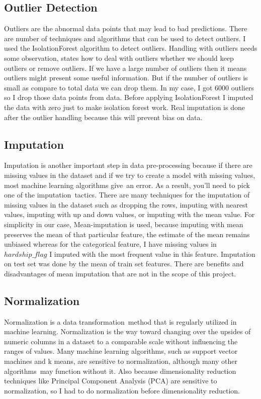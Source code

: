 \documentclass[12pt]{article}
\begin{document}
\subsection{Outlier Detection}
Outliers are the abnormal data points that may lead to bad predictions. There are number of techniques and algorithms that can be used to detect outliers. I used the IsolationForest algorithm to detect outliers. Handling with outliers needs some observation, \citep{outlier} states how to deal with outliers whether we should keep outliers or remove outliers. If we have a large number of outliers then it means outliers might present some useful information. But if the number of outliers is small as compare to total data we can drop them. In my case, I got 6000 outliers so I drop those data points from data. Before applying IsolationForest I imputed the data with zero just to make isolation forest work. Real imputation is done after the outlier handling because this will prevent bias on data.

\subsection{Imputation}
Imputation is another important step in data pre-processing because if there are missing values in the dataset and if we try to create a model with missing values, most machine learning algorithms give an error. As a result, you'll need to pick one of the imputation tactics. There are many techniques for the imputation of missing values in the dataset such as dropping the rows, imputing with nearest values, imputing with up and down values, or imputing with the mean value. For simplicity in our case, Mean-imputation is used, because imputing with mean preserves the mean of that particular feature, the estimate of the mean remains unbiased whereas for the categorical feature, I have missing values in $hardship\_flag$ I imputed with the most frequent value in this feature. Imputation on test set was done by the mean of train set features. There are benefits and disadvantages of mean imputation that are not in the scope of this project.

\subsection{Normalization}
Normalization is a data transformation method that is regularly utilized in machine learning. Normalization is the way toward changing over the upsides of numeric columns in a dataset to a comparable scale without influencing the ranges of values. Many machine learning algorithms, such as support vector machines and k means, are sensitive to normalization, although many other algorithms may function without it. Also because dimensionality reduction techniques like Principal Component Analysis (PCA) are sensitive to normalization, so I had to do normalization before dimensionality reduction.
\end{document}
